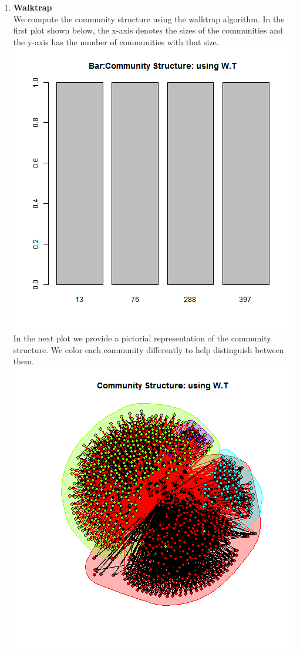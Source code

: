 \documentclass{article}
\begin{document}
\begin{enumerate}
\item \textbf{Walktrap}\\
 We compute the community structure using the walktrap algorithm.
 In the first plot shown below, the x-axis denotes the sizes of the communities and the y-axis has the number of communities with that size.\\
	\includegraphics[scale=0.4]{7f} \\
	In the next plot we provide a pictorial representation of the community structure.
	We color each community differently to help distinguish between them.\\
	\includegraphics[scale=0.7]{7g} \\ 


\end{enumerate}
\end{document}
